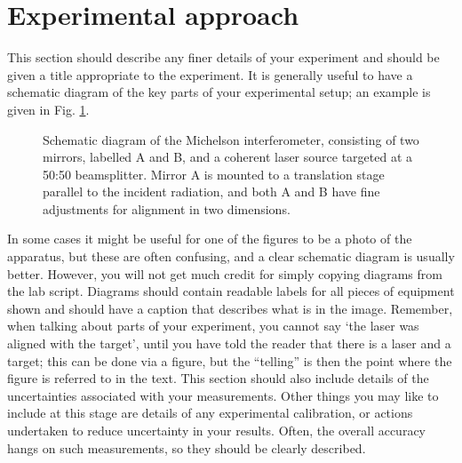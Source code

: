 \documentclass[11pt]{article} %
\begin{document}
\section{Experimental approach}
This section should describe any finer details of your experiment and should be given a title appropriate to the experiment. It is generally useful to have a schematic diagram of the key parts of your experimental setup; an example is given in Fig. \ref{Michelson}.\\

\begin{figure} %
\centering %
\caption{Schematic diagram of the Michelson interferometer, consisting of two mirrors, labelled A and B, and a coherent laser source targeted at a 50:50 beamsplitter. Mirror A is mounted to a translation stage parallel to the incident radiation, and both A and B have fine adjustments for alignment in two dimensions.} %
\label{Michelson} %
\end{figure}

 In some cases it might be useful for one of the figures to be a photo of the apparatus, but these are often confusing, and a clear schematic diagram is usually better. However, you will not get much credit for simply copying diagrams from the lab script. Diagrams should contain readable labels for all pieces of equipment shown and should have a caption that describes what is in the image. Remember, when talking about parts of your experiment, you cannot say `the laser was aligned with the target', 
%
%
until you have told the reader that there is a laser and a target; this can be done via a figure, but the “telling” is then the point where the figure is referred to in the text.  This section should also include details of the uncertainties associated with your measurements. Other things you may like to include at this stage are details of any experimental calibration, or actions undertaken to reduce uncertainty in your results. Often, the overall accuracy hangs on such measurements, so they should be clearly described. \\
\end{document}
